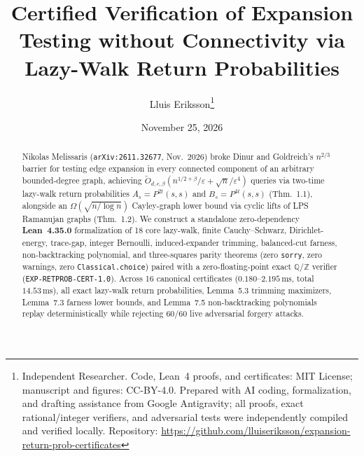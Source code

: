 \documentclass[10pt,twocolumn]{article}
\title{\vspace{-1.1em}\textbf{Certified Verification of Expansion Testing without Connectivity via Lazy-Walk Return Probabilities}}
\author{Lluis Eriksson\thanks{Independent Researcher. Code, Lean~4 proofs, and certificates: MIT License; manuscript and figures: CC-BY-4.0. Prepared with AI coding, formalization, and drafting assistance from Google Antigravity; all proofs, exact rational/integer verifiers, and adversarial tests were independently compiled and verified locally. Repository: \url{https://github.com/lluiseriksson/expansion-return-prob-certificates}}}
\date{November 25, 2026}
\begin{document}
\maketitle
\vspace{-1.4em}

\begin{abstract}
Nikolas Melissaris (\texttt{arXiv:2611.32677}, Nov.\ 2026) broke Dinur and Goldreich's $n^{2/3}$ barrier for testing edge expansion in every connected component of an arbitrary bounded-degree graph, achieving $\tilde{O}_{d,c,\beta}(n^{1/2+\beta}/\varepsilon + \sqrt{n}/\varepsilon^4)$ queries via two-time lazy-walk return probabilities $A_s = P^{2t}(s,s)$ and $B_s = P^{4t}(s,s)$ (Thm.~1.1), alongside an $\Omega(\sqrt{n/\log n})$ Cayley-graph lower bound via cyclic lifts of LPS Ramanujan graphs (Thm.~1.2). We construct a standalone zero-dependency \textbf{Lean~4.35.0} formalization of 18 core lazy-walk, finite Cauchy--Schwarz, Dirichlet-energy, trace-gap, integer Bernoulli, induced-expander trimming, balanced-cut farness, non-backtracking polynomial, and three-squares parity theorems (zero \texttt{sorry}, zero warnings, zero \texttt{Classical.choice}) paired with a zero-floating-point exact $\mathbb{Q}/\mathbb{Z}$ verifier (\texttt{EXP-RETPROB-CERT-1.0}). Across 16 canonical certificates ($0.180$--$2.195\,\mathrm{ms}$, total $14.53\,\mathrm{ms}$), all exact lazy-walk return probabilities, Lemma~5.3 trimming maximizers, Lemma~7.3 farness lower bounds, and Lemma~7.5 non-backtracking polynomials replay deterministically while rejecting 60/60 live adversarial forgery attacks.
\end{abstract}
\end{document}
